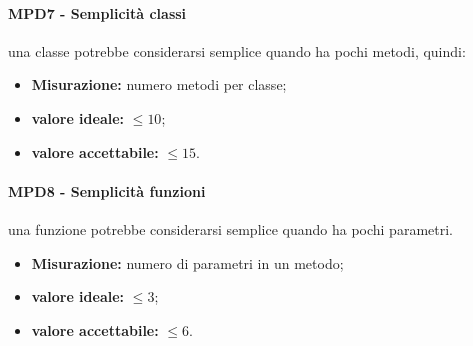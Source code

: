 \paragraph{MPD7 - Semplicità classi} una classe potrebbe considerarsi semplice quando ha pochi metodi, quindi:
\begin{itemize}
	\item \textbf{Misurazione:} numero metodi per classe;
	\item \textbf{valore ideale:} \begin{math}\leq10\end{math};
	\item \textbf{valore accettabile:} \begin{math}\leq15\end{math}.
\end{itemize}
\paragraph{MPD8 - Semplicità funzioni} una funzione potrebbe considerarsi semplice quando ha pochi parametri.
\begin{itemize}
	\item \textbf{Misurazione:} numero di parametri in un metodo;
	\item \textbf{valore ideale:} \begin{math}\leq3\end{math};
	\item \textbf{valore accettabile:} \begin{math}\leq6\end{math}.
\end{itemize}
